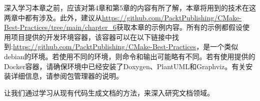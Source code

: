 深入学习本章之前，应该对第4章和第5章的内容有所了解，本章将用到的技术在这两章中都有涉及。此外，建议从\url{https://github.com/PacktPublishing/CMake-Best-Practices/tree/main/chapter_6}获取本章的示例内容。所有的示例都假设使用项目提供的开发环境容器，该容器可以在以下链接中找到:\url{https://github.com/PacktPublishing/CMake-Best-Practices}，是一个类似debian的环境。若使用不同的环境，则命令和输出可能略有不同。若有使用提供的Docker容器，请确保环境中已经安装了Doxygen、PlantUML和Graphviz。有关安装详细信息，请参阅包管理器的说明。

让我们通过学习从现有代码生成文档的方法，来深入研究文档领域。
